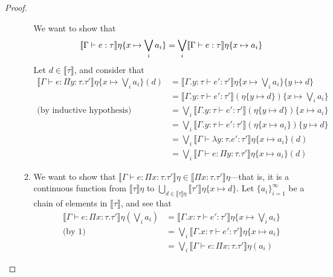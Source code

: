 \begin{proof}
\begin{itemize}
\begin{enumerate}
 We want to show that
 \begin{align*}
 \llbracket{{\Gamma}\vdash{e}:{\tau}}\rrbracket{\eta\{{x}\mapsto{\bigvee_i a_i}\}} =
\bigvee_i\llbracket{{\Gamma}\vdash{e}:{\tau}}\rrbracket{\eta\{{x}\mapsto{a_i}\}}
\end{align*}
Let $d \in \llbracket \tau \rrbracket$, and consider that
\begin{align*}
\llbracket \Gamma \vdash e : \Pi y: \tau.\tau' \rrbracket\eta\{x\mapsto  \bigvee_i a_i\}(d) 
&= \llbracket \Gamma.y : \tau \vdash e' : \tau'\rrbracket\eta\{x\mapsto  \bigvee_i a_i\}
\{y \mapsto d\} \\
&= \llbracket \Gamma.y : \tau \vdash e' : \tau'\rrbracket(\eta\{y \mapsto d\})\{x\mapsto  \bigvee_i a_i\} \\
\text{(by inductive hypothesis)}&=\bigvee_i\llbracket \Gamma.y:\tau\vdash e':\tau'\rrbracket(\eta\{y\mapsto d\})
\{x\mapsto a_i\} \\
&=\bigvee_i\llbracket \Gamma.y:\tau\vdash e':\tau'\rrbracket(\eta\{x\mapsto a_i\})\{y\mapsto d\} \\
&= \bigvee_i \llbracket \Gamma \vdash \lambda y : \tau.e' : \tau' \rrbracket \eta\{x\mapsto a_i\}(d) \\
&= \bigvee_i \llbracket \Gamma \vdash e : \Pi y:\tau.\tau' \rrbracket \eta\{x\mapsto a_i\}(d) 
\end{align*}
%
 \item We want to show that $\llbracket \Gamma \vdash e : \Pi x:\tau.\tau' \rrbracket\eta \in \llbracket \Pi x:\tau.
 \tau'\rrbracket\eta$---that is, it is a continuous function from $\llbracket \tau \rrbracket\eta$ to 
 $\bigcup_{d\in \llbracket \tau \rrbracket\eta}\llbracket \tau' \rrbracket\eta\{x \mapsto d\}$. Let 
 $\{a_i\}^{\infty}_{i=1}$ be a chain of elements in $\llbracket \tau \rrbracket$, and see that
 \begin{align*}
 \llbracket \Gamma \vdash e : \Pi x:\tau.\tau' \rrbracket\eta(\bigvee_i a_i) &= \llbracket \Gamma.x : \tau 
 \vdash e' : \tau'\rrbracket\eta \{x \mapsto \bigvee_i a_i\} \\
 \text{(by 1)} &= \bigvee_i \llbracket \Gamma.x : \tau \vdash e' : \tau'\rrbracket\eta\{x\mapsto a_i\}\\
 &= \bigvee_i \llbracket \Gamma \vdash e : \Pi x:\tau.\tau' \rrbracket\eta(a_i) 
 \end{align*}
 \end{enumerate} 
\end{itemize}
\end{proof}

